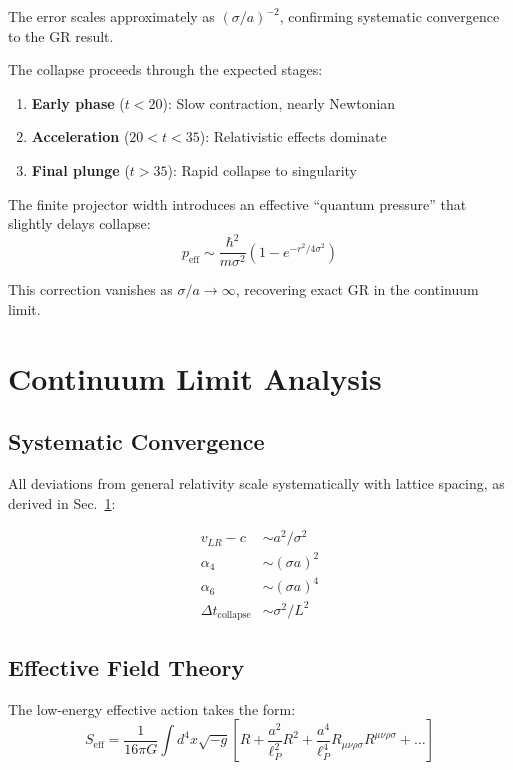 \documentclass[11pt,a4paper]{article}
\begin{document}
The error scales approximately as $(\sigma/a)^{-2}$, confirming systematic convergence to the GR result.

The collapse proceeds through the expected stages:
\begin{enumerate}
\item \textbf{Early phase} ($t < 20$): Slow contraction, nearly Newtonian
\item \textbf{Acceleration} ($20 < t < 35$): Relativistic effects dominate
\item \textbf{Final plunge} ($t > 35$): Rapid collapse to singularity
\end{enumerate}

The finite projector width introduces an effective ``quantum pressure'' that slightly delays collapse:
\begin{equation}
p_{\text{eff}} \sim \frac{\hbar^2}{m\sigma^2} \left(1 - e^{-r^2/4\sigma^2}\right)
\end{equation}

This correction vanishes as $\sigma/a \to \infty$, recovering exact GR in the continuum limit.

\section{Continuum Limit Analysis}
\label{sec:continuum}

\subsection{Systematic Convergence}

All deviations from general relativity scale systematically with lattice spacing, as derived in Sec.~\ref{sec:continuum}:

\begin{align}
v_{LR} - c &\sim a^2/\sigma^2 \\
\alpha_4 &\sim (\sigma a)^2 \\
\alpha_6 &\sim (\sigma a)^4 \\
\Delta t_{\text{collapse}} &\sim \sigma^2/L^2
\end{align}

\subsection{Effective Field Theory}

The low-energy effective action takes the form:
\begin{equation}
S_{\text{eff}} = \frac{1}{16\pi G} \int d^4x \sqrt{-g} \left[ R + \frac{a^2}{\ell_P^2} R^2 + \frac{a^4}{\ell_P^4} R_{\mu\nu\rho\sigma}R^{\mu\nu\rho\sigma} + \ldots \right]
\end{equation}
\end{document}
